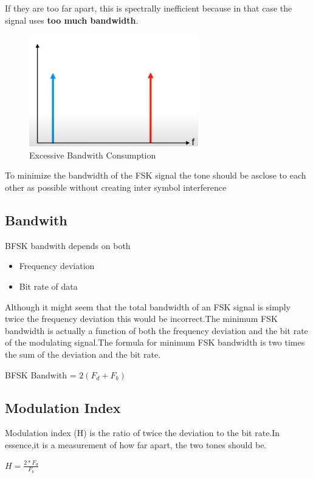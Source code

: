 \documentclass{report}
\begin{document}
{	  If they are too far apart, this is spectrally inefficient because in that case the signal uses \textbf{too much bandwidth}.
	  
	  \begin{figure}[H]
	  	\centering
	  	\includegraphics{images/9.png}
	  	\caption{Excessive Bandwith Consumption}
	  	\label{fig:}
	  \end{figure}
	  
	  
	  To minimize the bandwidth of the FSK signal the tone should be asclose to each other as possible without creating inter symbol interference
	 \subsection{Bandwith}
	 \bigskip
	 BFSK bandwith depends on both
	 \begin{itemize}
	 	\item Frequency deviation
	 	\item Bit rate of data
	 \end{itemize}
 	  
 	 \newpage 
 	  
	 Although it might seem that the total bandwidth of an FSK signal is simply twice the frequency deviation this would be incorrect.The minimum FSK bandwidth is actually a function of both the frequency deviation and the bit rate of the modulating signal.The formula for minimum FSK bandwidth is two times the sum of the deviation and the bit rate.
	 \begin{center}
	 	BFSK Bandwith = $2(F_d + F_b)$
	 \end{center}
	 
	 \subsection{Modulation Index}
	 \bigskip
	 Modulation index (H) is the ratio of twice the deviation to the bit rate.In essence,it is a measurement of how far apart, the two tones should be.
	 
	 \begin{center}
	 	 $H = \frac{2*F_d}{F_b}$  
	 \end{center}
	 
}
\end{document}
